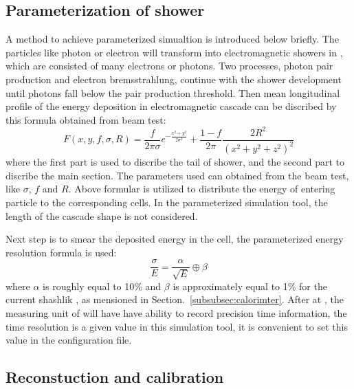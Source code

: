 \subsection{Parameterization of shower}

A method to achieve parameterized simualtion is introduced below briefly.
The particles like photon or electron will transform into electromagnetic showers in \ecal,
which are consisted of many electrons or photons.
Two processes, photon pair production and electron bremsstrahlung, 
continue with the shower development until photons fall below the pair production threshold.
Then mean longitudinal profile of the energy deposition in electromagnetic cascade can be discribed by this formula obtained from beam test\supercite{Levy:2017lpw}:
\begin{equation}
F(x,y,f,\sigma,R) = \frac{f}{2\pi\sigma}e^{-\frac{x^2+y^2}{2\sigma^{2}}} + \frac{1-f}{2\pi}\frac{2R^2}{(x^2+y^2+z^2)^2}
\end{equation}
where the first part is used to discribe the tail of shower,
and the second part to discribe the main section.
The parameters used can obtained from the beam test, like $\sigma$, $f$ and $R$.
Above formular is utilized to distribute the energy of entering particle to the corresponding cells.
In the parameterized simulation tool,
the length of the cascade shape is not considered.

Next step is to smear the deposited energy in the cell, 
the parameterized energy resolution formula is used:
\begin{equation}
\frac{\sigma}{E} = \frac{\alpha}{\sqrt{E}} \oplus \beta
\end{equation}
where $\alpha$ is roughly equal to 10\% and $\beta$ is approximately equal to 1\% for the current shashlik \ecal, 
as mensioned in Section.~\ref{subsubsec:calorimter}.
After \upgradetwo at \lhcb,
the measuring unit of \ecal will have have ability to record precision time information,
the time resolution is a given value in this simulation tool,
it is convenient to set this value in the configuration file.


\subsection{Reconstuction and calibration}

